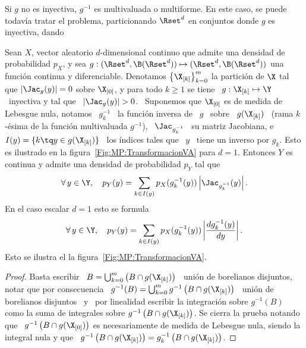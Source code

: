 Si $g$ no es inyectiva, $g^{-1}$  es multivaluada o multiforme. En este caso, se
puede todav\'ia  tratar el problema, particionando $\Rset^d$  en conjuntos donde
$g$ es inyectiva, dando
%
\begin{teorema}\label{Teo:MP:TransformacionNoInyectivaDensidad}
%
  Sean $X$, vector aleatorio $d$-dimensional continuo que admite una densidad de
  probabilidad  $p_X$,  y sea  $g:(\Rset^d  ,  \B(\Rset^d))  \mapsto (\Rset^d  ,
  \B(\Rset^d))$  una  funci\'on continua  y  diferenciable.  Denotamos  $\left\{
    \X_{[k]} \right\}_{k=0}^m$ la partici\'on  de $\X$ tal que $\left| \Jac_g(y)
  \right| = 0$ sobre  $\X_{[0]}$, y para todo $k \ge 1$  se tiene \ $g: \X_{[k]}
  \mapsto  \Y$ \  inyectiva  y  tal que  \  $\left| \Jac_g(y)  \right|  > 0$.  \
  Suponemos que $\X_{[0]}$ es de medida de Lebesgue nula, notamos \ $g_k^{-1}$ \
  la funci\'on inversa  de \ $g$ \ sobre \ $g(\X_{[k]})$  \ (rama $k$-\'esima de
  la  funci\'on   multivaluada  $g^{-1}$),  \  $\Jac_{g_k^{-1}}$   \  su  matriz
  Jacobiana, e \  $I(y) = \{ k \tq  y \in g(\X_{[k]}) \}$ \  los \'indices tales
  que  \  $y$  \  tiene  un   inverso  por  $g_k$.   Esto  es  ilustrado  en  la
  figura~\ref{Fig:MP:TransformacionVA} para $d = 1$.  Entonces $Y$ es continua y
  admite una densidad de probabilidad $p_Y$ tal que
  \[
  \forall  \, y  \in \Y,  \quad p_Y(y)  = \sum_{k  \in  I(y)} p_X(g_k^{-1}(y))
  \left| \Jac_{g_k^{-1}}(y) \right|.
  \]
  En el caso escalar $d = 1$ esto se formula
  \[
  \forall \, y \in \Y, \quad  p_Y(y) = \sum_{k \in I(y)} p_X(g_k^{-1}(y)) \left|
    \frac{d g_k^{-1}(y)}{dy} \right|.
  \]
  \noindent Esto se ilustra el la figura~\ref{Fig:MP:TransformacionVA}.
\end{teorema}
%
\begin{proof}
  Basta escribir \  $B = \bigcup_{k = 0}^m \left( B  \cap g(\X_{[k]}) \right)$ \
  uni\'on de  borelianos disjuntos,  notar que por  consecuencia \  $g^{-1}(B) =
  \bigcup_{k  =0}^m  g^{-1}\left(  B  \cap  g(\X_{[k]}) \right)$  \  uni\'on  de
  borelianos  disjuntos \  y \  por linealidad  escribir la  integraci\'on sobre
  $g^{-1}(B)$ como la suma de  integrales sobre $g^{-1}\left( B \cap g(\X_{[k]})
  \right)$. Se cierra  la prueba notando que \  $g^{-1}\left( B \cap g(\X_{[0]})
  \right)$ es necesariamente de medida de Lebesgue nula, siendo la integral nula
  y  que \  $g^{-1}\left( B  \cap g(\X_{[k]})  \right) =  g_k^{-1}\left(  B \cap
    g(\X_{[k]}) \right)$.
\end{proof}

